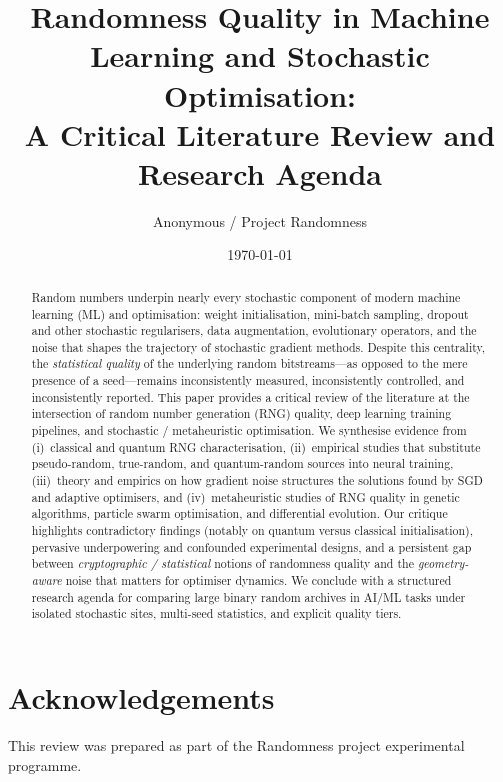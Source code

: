 \documentclass[11pt,a4paper]{article}
\title{%
  Randomness Quality in Machine Learning and Stochastic Optimisation:\\
  A Critical Literature Review and Research Agenda
}
\author{%
  Anonymous / Project Randomness
}
\date{\today}
\theoremstyle{definition}
\begin{document}
\maketitle

\begin{abstract}
Random numbers underpin nearly every stochastic component of modern machine learning (ML) and optimisation: weight initialisation, mini-batch sampling, dropout and other stochastic regularisers, data augmentation, evolutionary operators, and the noise that shapes the trajectory of stochastic gradient methods.
Despite this centrality, the \emph{statistical quality} of the underlying random bitstreams---as opposed to the mere presence of a seed---remains inconsistently measured, inconsistently controlled, and inconsistently reported.
This paper provides a critical review of the literature at the intersection of random number generation (RNG) quality, deep learning training pipelines, and stochastic / metaheuristic optimisation.
We synthesise evidence from (i)~classical and quantum RNG characterisation, (ii)~empirical studies that substitute pseudo-random, true-random, and quantum-random sources into neural training, (iii)~theory and empirics on how gradient noise structures the solutions found by SGD and adaptive optimisers, and (iv)~metaheuristic studies of RNG quality in genetic algorithms, particle swarm optimisation, and differential evolution.
Our critique highlights contradictory findings (notably on quantum versus classical initialisation), pervasive underpowering and confounded experimental designs, and a persistent gap between \emph{cryptographic / statistical} notions of randomness quality and the \emph{geometry-aware} noise that matters for optimiser dynamics.
We conclude with a structured research agenda for comparing large binary random archives in AI/ML tasks under isolated stochastic sites, multi-seed statistics, and explicit quality tiers.
\end{abstract}

\tableofcontents
\newpage










\section*{Acknowledgements}
This review was prepared as part of the Randomness project experimental programme.


\end{document}
